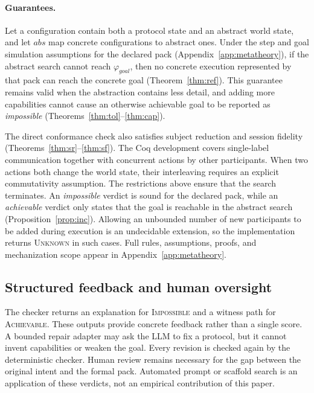 \documentclass{article}
\theoremstyle{plain}
\theoremstyle{definition}
\newcommand{\gphi}{\varphi_{\mathit{goal}}}
\def \bgc {}
\def \egc {}
\begin{document}
\paragraph{Guarantees.}
Let a configuration contain both a protocol state and an abstract world state,
and let $\mathit{abs}$ map concrete configurations to abstract ones. Under the
step and goal simulation assumptions for the declared pack
(Appendix~\ref{app:metatheory}), if the abstract search cannot reach $\gphi$,
then no concrete execution represented by that pack can reach the concrete goal
(Theorem~\ref{thm:ref}). This guarantee remains valid when the abstraction
contains less detail, and adding more capabilities cannot cause an otherwise
achievable goal to be reported as \emph{impossible}
(Theorems~\ref{thm:tol}--\ref{thm:cap}).

The direct conformance check also satisfies subject reduction and session
fidelity (Theorems~\ref{thm:sr}--\ref{thm:sf}). The Coq development covers
single-label communication together with concurrent actions by other
participants. \bgc When two actions both change the world state, their
interleaving requires an explicit commutativity assumption. The restrictions
above ensure that the search terminates. An \emph{impossible} verdict is sound
for the declared pack, while an \emph{achievable} verdict only states that the
goal is reachable in the abstract search (Proposition~\ref{prop:inc}).\egc
Allowing an unbounded number of new participants to be added during execution
is an undecidable extension, so the implementation returns \textsc{Unknown} in
such cases. Full rules, assumptions, proofs, and mechanization scope appear in
Appendix~\ref{app:metatheory}.

\subsection{Structured feedback and human oversight}\label{sec:signals}

The checker returns an explanation for \textsc{Impossible} and a witness path
for \textsc{Achievable}. These outputs provide concrete feedback rather than a
single score. A bounded repair adapter may ask the LLM to fix a protocol, but
it cannot invent capabilities or weaken the goal. Every revision is checked
again by the deterministic checker. Human review remains necessary for the gap
between the original intent and the formal pack. Automated prompt or scaffold
search is an application of these verdicts, not an empirical contribution of
this paper.
\end{document}
